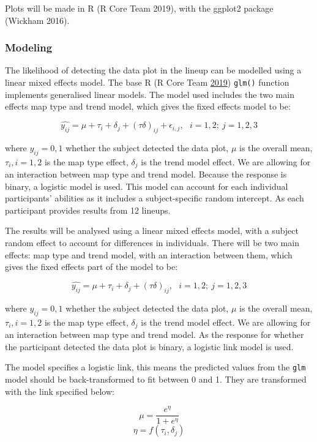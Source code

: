\documentclass[conference,final,]{IEEEtran}
\begin{document}
Plots will be made in R (R Core Team 2019), with the ggplot2 package
(Wickham 2016).

\hypertarget{modeling}{%
\subsubsection{Modeling}\label{modeling}}

The likelihood of detecting the data plot in the lineup can be modelled
using a linear mixed effects model. The base R (R Core Team
\protect\hyperlink{ref-RCore}{2019}) \texttt{glm()} function implements
generalised linear models. The model used includes the two main effects
map type and trend model, which gives the fixed effects model to be:

\[\widehat{y_{ij}} = \mu + \tau_i + \delta_j + (\tau\delta)_{ij} + \epsilon_{i,j}, ~~~ i=1,2; ~j=1,2,3\]

where \(y_{ij} = 0, 1\) whether the subject detected the data plot,
\(\mu\) is the overall mean, \(\tau_i, i=1,2\) is the map type effect,
\(\delta_j\) is the trend model effect. We are allowing for an
interaction between map type and trend model. Because the response is
binary, a logistic model is used. This model can account for each
individual participants' abilities as it includes a subject-specific
random intercept. As each participant provides results from 12 lineups.

The results will be analysed using a linear mixed effects model, with a
subject random effect to account for differences in individuals. There
will be two main effects: map type and trend model, with an interaction
between them, which gives the fixed effects part of the model to be:

\[\widehat{y_{ij}} = \mu + \tau_i + \delta_j + (\tau\delta)_{ij}, ~~~ i=1,2; ~j=1,2,3\]

where \(y_{ij} = 0, 1\) whether the subject detected the data plot,
\(\mu\) is the overall mean, \(\tau_i, i=1,2\) is the map type effect,
\(\delta_j\) is the trend model effect. We are allowing for an
interaction between map type and trend model. As the response for
whether the participant detected the data plot is binary, a logistic
link model is used.

The model specifies a logistic link, this means the predicted values
from the \texttt{glm} model should be back-transformed to fit between 0
and 1. They are transformed with the link specified below:

\[\mu = \frac{e^{\eta}}{1 + e^{\eta}}\] \[\eta = f(\tau_i,\delta_j)\]
\end{document}
